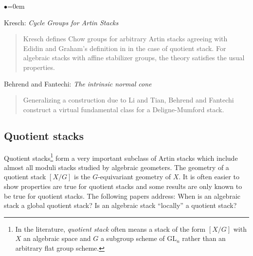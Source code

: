 \begin{list}{$\bullet$}{\leftmargin=0em}
\begin{quote}
\end{quote}
\smallskip
\item
Kresch: \emph{Cycle Groups for Artin Stacks} \cite{kresch_cycle}
\begin{quote}
Kresch defines Chow groups for arbitrary Artin stacks agreeing with Edidin and
Graham's definition in \cite{edidin-graham} in the case of quotient stack. For
algebraic stacks with affine stabilizer groups, the theory satisfies the usual
properties.
\end{quote}
\smallskip
\item Behrend and Fantechi: \emph{The intrinsic normal cone}
\cite{behrend-fantechi}
\begin{quote}
Generalizing a construction due to Li and Tian, Behrend and Fantechi construct
a virtual fundamental class for a Deligne-Mumford stack.
\end{quote}
\end{list}

\smallskip

\subsection{Quotient stacks}
\label{subsection-quotient-stacks}

\noindent
Quotient stacks\footnote{In the literature,
\emph{quotient stack} often means a stack of the
form $[X/G]$ with $X$ an algebraic space and $G$ a subgroup scheme
of $\text{GL}_n$ rather than an arbitrary flat group scheme.}
form a very important subclass of Artin stacks which include almost all moduli
stacks studied by algebraic geometers. The geometry of a quotient stack
$[X/G]$ is the $G$-equivariant geometry of $X$. It is often easier to show
properties are true for quotient stacks and some results are only known to be
true for quotient stacks. The following papers address: When is an algebraic
stack a global quotient stack? Is an algebraic stack ``locally'' a quotient
stack?

